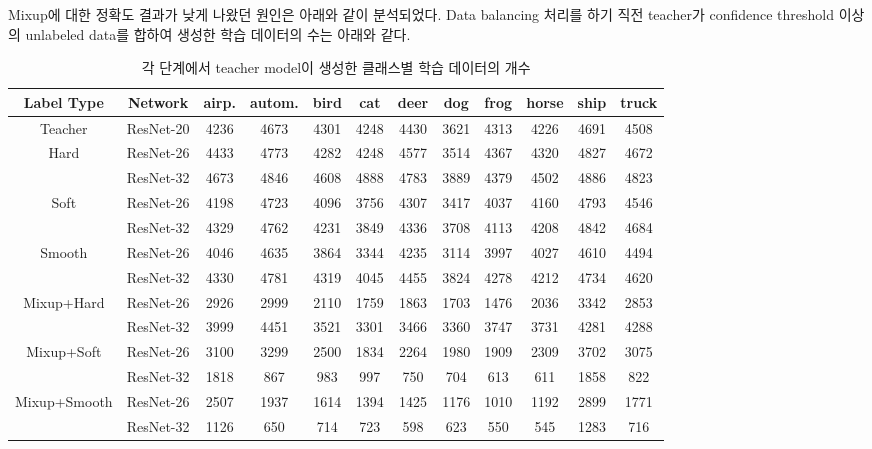 Mixup에 대한 정확도 결과가 낮게 나왔던 원인은 아래와 같이 분석되었다. Data balancing 처리를 하기 직전 teacher가 confidence threshold 이상의 unlabeled data를 합하여 생성한 학습 데이터의 수는 아래와 같다.

\begin{table}[!h]
  \center
  \begin{tabular}{|c|c|cccccccccc|}
\hline
Label Type & Network & airp. & autom. & bird & cat & deer & dog & frog & horse & ship & truck \\ \hline
Teacher & ResNet-20 & 4236 & 4673 & 4301 & 4248 & 4430 & 3621 & 4313 & 4226 & 4691 & 4508 \\ \hline
Hard & ResNet-26 & 4433 & 4773 & 4282 & 4248 & 4577 & 3514 & 4367 & 4320 & 4827 & 4672 \\
     & ResNet-32 & 4673 & 4846 & 4608 & 4888 & 4783 & 3889 & 4379 & 4502 & 4886 & 4823 \\ \hline

Soft & ResNet-26 & 4198 & 4723 & 4096 & 3756 & 4307 & 3417 & 4037 & 4160 & 4793 & 4546 \\
     & ResNet-32 & 4329 & 4762 & 4231 & 3849 & 4336 & 3708 & 4113 & 4208 & 4842 & 4684 \\ \hline

Smooth & ResNet-26 & 4046 & 4635 & 3864 & 3344 & 4235 & 3114 & 3997 & 4027 & 4610 & 4494 \\
     & ResNet-32 & 4330 & 4781 & 4319 & 4045 & 4455 & 3824 & 4278 & 4212 & 4734 & 4620 \\ \hline

Mixup+Hard & ResNet-26 & 2926 & 2999 & 2110 & 1759 & 1863 & 1703 & 1476 & 2036 & 3342 & 2853 \\
     & ResNet-32 & 3999 & 4451 & 3521 & 3301 & 3466 & 3360 & 3747 & 3731 & 4281 & 4288 \\ \hline

Mixup+Soft & ResNet-26 & 3100 & 3299 & 2500 & 1834 & 2264 & 1980 & 1909 & 2309 & 3702 & 3075 \\
     & ResNet-32 & 1818 & 867 & 983 & 997 & 750 & 704 & 613 & 611 & 1858 & 822 \\ \hline

Mixup+Smooth & ResNet-26 & 2507 & 1937 & 1614 & 1394 & 1425 & 1176 & 1010 & 1192 & 2899 & 1771 \\
     & ResNet-32 & 1126 & 650 & 714 & 723 & 598 & 623 & 550 & 545 & 1283 & 716 \\ \hline
  \end{tabular}
  \caption{각 단계에서 teacher model이 생성한 클래스별 학습 데이터의 개수}
  \label{datagen}
\end{table}

